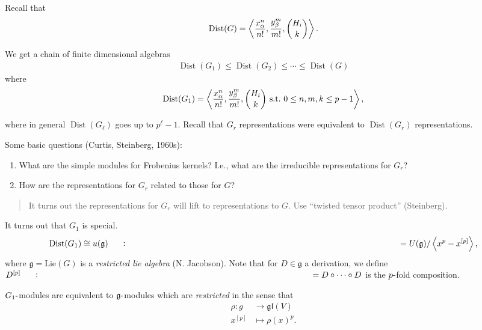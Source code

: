 Recall that
\begin{align*}   \operatorname{Dist}(G) = \left\langle{ {x_\alpha^n \over n!}, {y_\beta^m \over m!}, {H_i \choose k} }\right\rangle .\end{align*}

We get a chain of finite dimensional algebras
\begin{align*}   \operatorname{Dist}(G_1) \leq \operatorname{Dist}(G_2) \leq \cdots \leq \operatorname{Dist}(G) \end{align*}
where
\begin{align*}   \operatorname{Dist}(G_1) = \left\langle{ {x_\alpha^n \over n!}, {y_\beta^m \over m!}, {H_i \choose k} ~{\text{s.t.}}~0\leq n,m,k \leq p-1 }\right\rangle ,\end{align*}

where in general \(\operatorname{Dist}(G_\ell)\) goes up to
\(p^{\ell} - 1\). Recall that \(G_r\) representations were equivalent to
\(\operatorname{Dist}(G_r)\) representations.

Some basic questions (Curtis, Steinberg, 1960s):

\begin{enumerate}
\def\labelenumi{\arabic{enumi}.}
\item
  What are the simple modules for Frobenius kernels? I.e., what are the
  irreducible representations for \(G_r\)?
\item
  How are the representations for \(G_r\) related to those for \(G\)?
\end{enumerate}

\begin{quote}
It turns out the representations for \(G_r\) will lift to
representations to \(G\). Use ``twisted tensor product'' (Steinberg).
\end{quote}

\begin{remark}

\begin{remark}

It turns out that \(G_1\) is special.
\begin{align*}   \operatorname{Dist}(G_1) \cong u({\mathfrak{g}}) \mathrel{\vcenter{:}}= U({\mathfrak{g}}) / \left\langle{x^p - x^{[p]}}\right\rangle ,\end{align*}
where \({\mathfrak{g}}= \mathrm{Lie}(G)\) is a \emph{restricted lie
algebra} (N. Jacobson). Note that for \(D\in {\mathfrak{g}}\) a
derivation, we define
\(D^{[p]} \mathrel{\vcenter{:}}= D\circ \cdots \circ D\) is the
\(p{\hbox{-}}\)fold composition.

\(G_1{\hbox{-}}\)modules are equivalent to
\({\mathfrak{g}}{\hbox{-}}\)modules which are \emph{restricted} in the
sense that
\begin{align*}   \rho: g &\to {\mathfrak{gl}}(V) \\ x^{[p]} &\mapsto \rho(x)^p .\end{align*}

\end{remark}

\end{remark}

